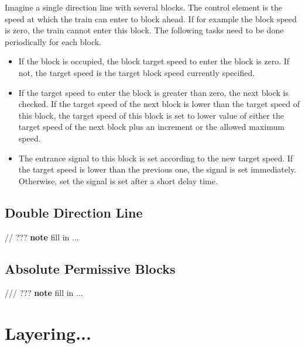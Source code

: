 Imagine a single direction line with several blocks. The control element is the speed at which the train can enter to block ahead. If for example the block speed is zero, the train cannot enter this block. The following tasks need to be done periodically for each block.
\begin{itemize}
\item If the block is occupied, the block target speed to enter the block is zero. If not, the target speed is the target block speed currently specified.
\item If the target speed to enter the block is greater than zero, the next block is checked. If the target speed of the next block is lower than the target speed of this block, the target speed of this block is set to lower value of either the target speed of the next block plus an increment or the allowed maximum speed.
\item The entrance signal to this block is set according to the new target speed. If the target speed is lower than the previous one, the signal is set immediately. Otherwise, set the signal is set after a short delay time.
\end{itemize}

\subsection{Double Direction Line}

// ??? \textbf{note} fill in ...

\subsection{Absolute Permissive Blocks}

/// ??? \textbf{note} fill in ...


\section{Layering...}


